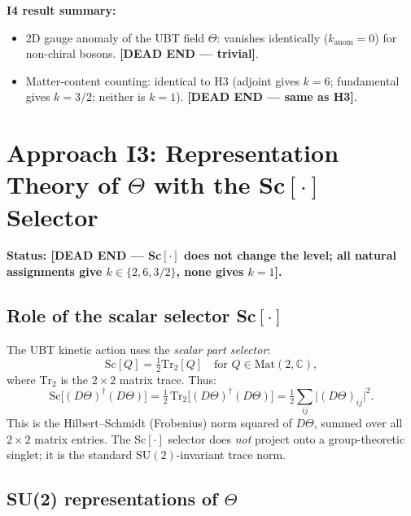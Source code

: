 \documentclass[11pt,a4paper]{article}
\theoremstyle{definition}
\theoremstyle{remark}
\begin{document}
\textbf{I4 result summary:}
\begin{itemize}
  \item 2D gauge anomaly of the UBT field $\Theta$: vanishes identically
    ($k_{\mathrm{anom}} = 0$) for non-chiral bosons.
    \textbf{[DEAD END — trivial]}.
  \item Matter-content counting: identical to H3 (adjoint gives $k=6$;
    fundamental gives $k=3/2$; neither is $k=1$).
    \textbf{[DEAD END — same as H3]}.
\end{itemize}

\section{Approach I3: Representation Theory of \texorpdfstring{$\Theta$}{Theta}
with the Sc\texorpdfstring{$[\cdot]$}{[.]} Selector}
\label{sec:I3}

\textbf{Status: [DEAD END — Sc$[\cdot]$ does not change the level;
all natural assignments give $k \in \{2, 6, 3/2\}$, none gives
$k = 1$].}

\subsection{Role of the scalar selector \texorpdfstring{Sc$[\cdot]$}{Sc[.]}}

The UBT kinetic action uses the \emph{scalar part selector}:
\begin{equation}
  \mathrm{Sc}[Q] = \tfrac{1}{2}\mathrm{Tr}_2[Q]
  \quad \text{for } Q \in \mathrm{Mat}(2,\mathbb{C}),
\end{equation}
where $\mathrm{Tr}_2$ is the $2\times 2$ matrix trace.
Thus:
\begin{equation}
  \mathrm{Sc}\bigl[(D\Theta)^\dagger(D\Theta)\bigr]
  = \tfrac{1}{2}\,\mathrm{Tr}_2\bigl[(D\Theta)^\dagger(D\Theta)\bigr]
  = \tfrac{1}{2}\sum_{ij}\bigl|(D\Theta)_{ij}\bigr|^2.
  \label{eq:Sc_as_trace}
\end{equation}
This is the Hilbert–Schmidt (Frobenius) norm squared of $D\Theta$,
summed over all $2\times 2$ matrix entries.  The Sc$[\cdot]$ selector
does \emph{not} project onto a group-theoretic singlet; it is the
standard $\mathrm{SU}(2)$-invariant trace norm.

\subsection{SU(2) representations of \texorpdfstring{$\Theta$}{Theta}}
\end{document}
